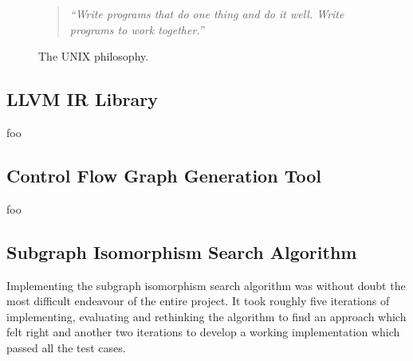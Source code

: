 \begin{figure}[htbp]
	\begin{center}
		\begin{quote}
			\textit{``Write programs that do one thing and do it well. Write programs to work together.''} \cite{art_of_unix}
		\end{quote}
		\caption{The UNIX philosophy.}
		\label{fig:unix_philosophy}
	\end{center}
\end{figure}


\subsection{LLVM IR Library}


%

foo


\subsection{Control Flow Graph Generation Tool}

foo


\subsection{Subgraph Isomorphism Search Algorithm}

Implementing the subgraph isomorphism search algorithm was without doubt the most difficult endeavour of the entire project. It took roughly five iterations of implementing, evaluating and rethinking the algorithm to find an approach which felt right and another two iterations to develop a working implementation which passed all the test cases.

